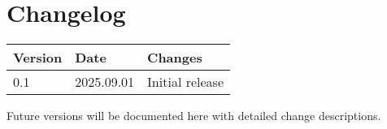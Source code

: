 
\section*{Changelog}

\begin{tabular}{lll}
\toprule
Version & Date & Changes \\
\midrule
0.1 & 2025.09.01 & Initial release \\
\bottomrule
\end{tabular}

\vspace{1cm}

\noindent Future versions will be documented here with detailed change descriptions.